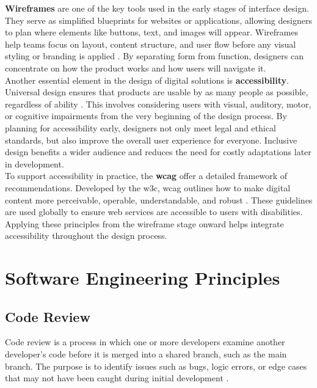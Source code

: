 {\textbf{Wireframes} are one of the key tools used in the early stages of interface design. They serve as simplified blueprints for websites or applications, allowing designers to plan where elements like buttons, text, and images will appear. Wireframes help teams focus on layout, content structure, and user flow before any visual styling or branding is applied \cite{balsamiq:wireframe}. By separating form from function, designers can concentrate on how the product works and how users will navigate it. \\

Another essential element in the design of digital solutions is \textbf{accessibility}. Universal design ensures that products are usable by as many people as possible, regardless of ability \cite{uutilsynet:universellutforming}. This involves considering users with visual, auditory, motor, or cognitive impairments from the very beginning of the design process. By planning for accessibility early, designers not only meet legal and ethical standards, but also improve the overall user experience for everyone. Inclusive design benefits a wider audience and reduces the need for costly adaptations later in development. \\

To support accessibility in practice, the \textbf{\gls{wcag}} offer a detailed framework of recommendations. Developed by the \gls{w3c}, \gls{wcag} outlines how to make digital content more perceivable, operable, understandable, and robust \cite{levelaccess:wcag}. These guidelines are used globally to ensure web services are accessible to users with disabilities. Applying these principles from the wireframe stage onward helps integrate accessibility throughout the design process.

\section{Software Engineering Principles}
\label{sec:software-engineering-principles}

\subsection{Code Review}
\label{subsec:code-review}

Code review is a process in which one or more developers examine another developer’s code before it is merged into a shared branch, such as the main branch. The purpose is to identify issues such as bugs, logic errors, or edge cases that may not have been caught during initial development \cite{gitlab:code-review}. \\

}

